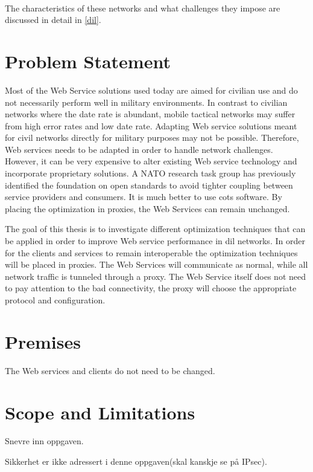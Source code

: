 \documentclass[USenglish]{ifimaster}
\begin{document}
\paragraph{}
The characteristics of these networks and what challenges they impose are
discussed in detail in \cref{dil}.

\section{Problem Statement}
Most of the Web Service solutions used today are aimed for civilian use and do
not necessarily perform well in military environments. In contrast to civilian
networks where the date rate is abundant, mobile tactical networks may suffer
from high error rates and low date rate. Adapting Web service solutions meant
for civil networks directly for military purposes may not be possible.
Therefore, Web services needs to be adapted in order to handle network
challenges. However, it can be very expensive to alter existing Web service
technology and incorporate proprietary solutions. A NATO research task group has
previously identified the foundation on open standards to avoid tighter coupling
between service providers and consumers\cite{IST-090}. It is much better to use
\gls{cots} software. By placing the optimization in proxies, the
Web Services can remain unchanged.

The goal of this thesis is to investigate different optimization techniques that
can be applied in order to improve Web service performance in \gls{dil}
networks. In order for the clients and services to remain interoperable the
optimization techniques will be placed in proxies. The Web Services will
communicate as normal, while all network traffic is tunneled through a proxy.
The Web Service itself does not need to pay attention to the bad connectivity,
the proxy will choose the appropriate protocol and configuration.

\section{Premises}
The Web services and clients do not need to be changed.

\section{Scope and Limitations}
Snevre inn oppgaven.

Sikkerhet er ikke adressert i denne oppgaven(skal kanskje se på IPsec).
\end{document}
